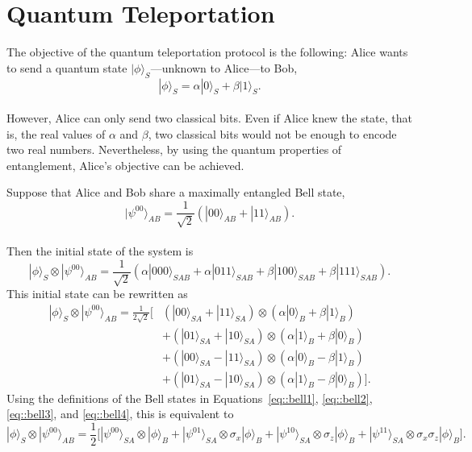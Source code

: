 \documentclass[a4paper]{article}
\begin{document}
\section{Quantum Teleportation}
The objective of the quantum teleportation protocol is the following: Alice wants to send a quantum state $|\phi\rangle_S$---unknown to Alice---to Bob,
\begin{equation}
|\phi\rangle_S=\alpha|0\rangle_S+\beta|1\rangle_S.
\end{equation}\\
However, Alice can only send two classical bits. Even if Alice knew the state, that is, the real values of $\alpha$ and $\beta$, two classical bits would not be enough to encode two real numbers. Nevertheless, by using the quantum properties of entanglement, Alice's objective can be achieved.

Suppose that Alice and Bob share a maximally entangled Bell state,
\begin{equation}
|\psi^{00}\rangle_{AB}=\frac{1}{\sqrt{2}}(|00\rangle_{AB}+|11\rangle_{AB}).
\end{equation}\\
Then the initial state of the system is
\begin{equation}
|\phi\rangle_S\otimes |\psi^{00}\rangle_{AB}=\frac{1}{\sqrt{2}}(\alpha|000\rangle_{SAB}+\alpha|011\rangle_{SAB}+\beta|100\rangle_{SAB}+\beta|111\rangle_{SAB}).
\end{equation}
This initial state can be rewritten as
\begin{equation}
\begin{split}
|\phi\rangle_S\otimes |\psi^{00}\rangle_{AB}=\frac{1}{2\sqrt{2}}\bigg[ &( |00\rangle_{SA}+|11\rangle_{SA})\otimes(\alpha|0\rangle_B+\beta|1\rangle_B)\\
&+(|01\rangle_{SA}+|10\rangle_{SA})\otimes(\alpha|1\rangle_B+\beta|0\rangle_B) \\
&+(|00\rangle_{SA}-|11\rangle_{SA})\otimes(\alpha|0\rangle_B-\beta|1\rangle_B)\\
&+(|01\rangle_{SA}-|10\rangle_{SA})\otimes(\alpha|1\rangle_B-\beta|0\rangle_B)\bigg].
\end{split}
\end{equation}
Using the definitions of the Bell states in Equations~\ref{eq::bell1}, \ref{eq::bell2}, \ref{eq::bell3}, and \ref{eq::bell4}, this is equivalent to
\begin{equation}
|\phi\rangle_S\otimes |\psi^{00}\rangle_{AB}=\frac{1}{2}\bigg[|\psi^{00}\rangle_{SA}\otimes|\phi\rangle_B+|\psi^{01}\rangle_{SA}\otimes\sigma_x|\phi\rangle_B +|\psi^{10}\rangle_{SA}\otimes\sigma_z|\phi\rangle_B+|\psi^{11}\rangle_{SA}\otimes\sigma_x\sigma_z|\phi\rangle_B \bigg].
\end{equation}\\
\end{document}
